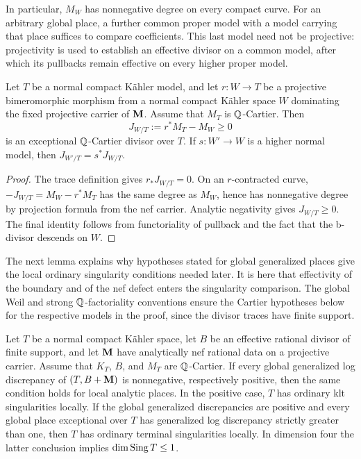 In particular, $M_W$ has nonnegative degree on every compact curve.
For an arbitrary global place, a further common proper model with a
model carrying that place suffices to compare coefficients.  This last
model need not be projective: projectivity is used to establish an
effective divisor on a common model, after which its pullbacks remain
effective on every higher proper model.

\begin{lemma}\label{lem:nef-defect}
Let $T$ be a normal compact K\"ahler model, and let $r:W\to T$ be a
projective bimeromorphic morphism from a normal compact K\"ahler space
$W$ dominating the fixed projective carrier of $\mathbf{M}$.  Assume that
$M_T$ is $\mathbb{Q}$-Cartier.  Then
\begin{equation}\label{eq:nef-defect}
 J_{W/T}:=r^*M_T-M_W\geq0
\end{equation}
is an exceptional $\mathbb{Q}$-Cartier divisor over $T$.  If $s:W'\to W$ is
a higher normal model, then $J_{W'/T}=s^*J_{W/T}$.
\end{lemma}

\begin{proof}
The trace definition gives $r_*J_{W/T}=0$.  On an $r$-contracted curve,
$-J_{W/T}=M_W-r^*M_T$ has the same degree as $M_W$, hence has
nonnegative degree by projection formula from the nef carrier.
Analytic negativity gives $J_{W/T}\geq0$.
The final identity follows from functoriality of pullback and the fact
that the b-divisor descends on $W$.
\end{proof}

The next lemma explains why hypotheses stated for global generalized
places give the local ordinary singularity conditions needed later.
It is here that effectivity of the boundary and of the nef defect
enters the singularity comparison.  The global Weil and strong
$\mathbb{Q}$-factoriality conventions ensure the Cartier hypotheses below for
the respective models in the proof, since the divisor traces have
finite support.

\begin{lemma}
\label{lem:ordinary-singularities}
Let $T$ be a normal compact K\"ahler space, let $B$ be an effective
rational divisor of finite support, and let $\mathbf{M}$ have analytically nef
rational data on a projective carrier.  Assume that $K_T$, $B$, and
$M_T$ are $\mathbb{Q}$-Cartier.
If every global generalized log discrepancy of $(T,B+\mathbf{M})$ is
nonnegative, respectively positive, then the same condition holds for
local analytic places.  In the positive case, $T$ has ordinary klt
singularities locally.  If the global generalized discrepancies are
positive and every global place exceptional over $T$ has generalized
log discrepancy strictly greater than one,
then $T$ has ordinary terminal singularities locally.  In dimension
four the latter conclusion implies $\dim\operatorname{Sing} T\leq1$.
\end{lemma}

